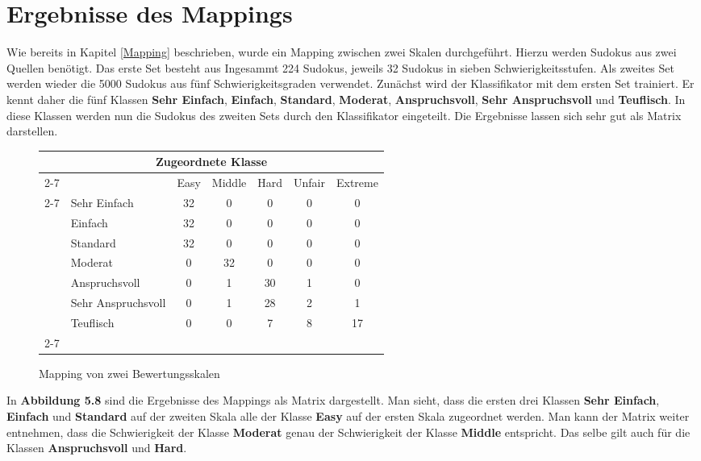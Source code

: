 \newpage
\section{Ergebnisse des Mappings}
Wie bereits in Kapitel \ref{Mapping} beschrieben, wurde ein Mapping zwischen zwei Skalen durchgeführt. Hierzu werden Sudokus aus zwei Quellen benötigt. Das erste Set besteht aus Ingesammt 224 Sudokus, jeweils 32 Sudokus in sieben Schwierigkeitsstufen. Als zweites Set werden wieder die 5000 Sudokus aus fünf Schwierigkeitsgraden verwendet. Zunächst wird der Klassifikator mit dem ersten Set trainiert. Er kennt daher die fünf Klassen \textbf{Sehr Einfach}, \textbf{Einfach}, \textbf{Standard}, \textbf{Moderat}, \textbf{Anspruchsvoll}, \textbf{Sehr Anspruchsvoll} und \textbf{Teuflisch}. In diese Klassen werden nun die Sudokus des zweiten Sets durch den Klassifikator eingeteilt. Die Ergebnisse lassen sich sehr gut als Matrix darstellen.\\
\begin{figure}[H]
\centering
\begin{tabular}{ l | l |  c  c  c  c  c |}
\multicolumn{7}{c}{\textbf{Zugeordnete Klasse}}\\
\cline{2-7}
\multirow{6}{*}{\begin{turn}{90}\textbf{Ursprüngliche Klasse}\end{turn}}
&  & Easy & Middle & Hard & Unfair & Extreme\\
\cline{2-7}
& Sehr Einfach & 32 & 0 & 0 & 0 & 0\\
& Einfach & 32 & 0 & 0 & 0 & 0\\
& Standard & 32 & 0 & 0 & 0 & 0\\
& Moderat & 0 & 32 & 0 & 0 & 0\\
& Anspruchsvoll & 0 & 1 & 30 & 1 & 0\\
& Sehr Anspruchsvoll & 0 & 1 & 28 & 2 & 1\\
& Teuflisch & 0 & 0 & 7 & 8 & 17\\
\cline{2-7}
\end{tabular}
\caption{Mapping von zwei Bewertungsskalen}
\end{figure}
In \textbf{Abbildung 5.8} sind die Ergebnisse des Mappings als Matrix dargestellt. Man sieht, dass die ersten drei Klassen \textbf{Sehr Einfach}, \textbf{Einfach} und \textbf{Standard} auf der zweiten Skala alle der Klasse \textbf{Easy} auf der ersten Skala zugeordnet werden. Man kann der Matrix weiter entnehmen, dass die Schwierigkeit der Klasse \textbf{Moderat} genau der Schwierigkeit der Klasse \textbf{Middle} entspricht. Das selbe gilt auch für die Klassen \textbf{Anspruchsvoll} und \textbf{Hard}.
